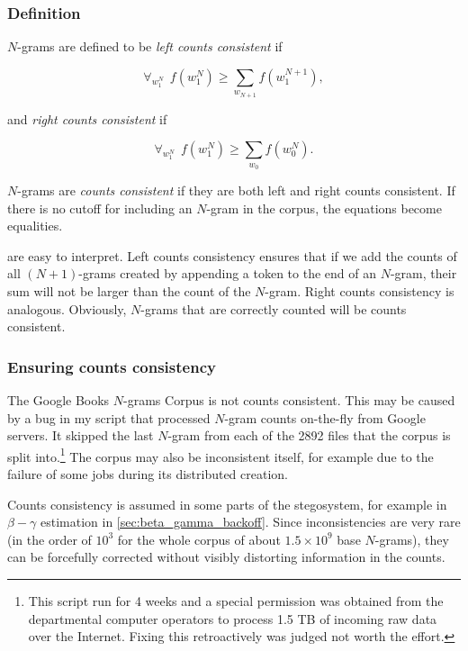 \documentclass[draft]{IIBproject}
\makeatletter
\DeclareRobustCommand{\npgrams}{\mbox{$(N{+}1)$-grams}\@\xspace}
\makeatother
\begin{document}
\subsubsection{Definition}

$N$-grams are defined to be \emph{left counts consistent} if

\begin{equation}
\label{eq:left_counts_consistency}
\forall_{w_1^N} ~~ f(w_1^N) \ge \sum_{w_{N+1}} f(w_1^{N+1}),
\end{equation}

and \emph{right counts consistent} if

\begin{equation}
\label{eq:right_counts_consistency}
\forall_{w_1^N} ~~ f(w_1^N) \ge \sum_{w_0} f(w_0^N).
\end{equation}

$N$-grams are \emph{counts consistent} if they are both left and right counts consistent. If there is no cutoff for including an $N$-gram in the corpus, the equations become equalities.

 are easy to interpret. Left counts consistency ensures that if we add the counts of all \npgrams created by appending a token to the end of an $N$-gram, their sum will not be larger than the count of the $N$-gram. Right counts consistency is analogous. Obviously, $N$-grams that are correctly counted will be counts consistent.

\subsubsection{Ensuring counts consistency}

The Google Books $N$-grams Corpus is not counts consistent. This may be caused by a bug in my script that processed $N$-gram counts on-the-fly from Google servers. It skipped the last $N$-gram from each of the 2892 files that the corpus is split into.\footnote{This script run for 4 weeks and a special permission was obtained from the departmental computer operators to process 1.5 TB of incoming raw data over the Internet. Fixing this retroactively was judged not worth the effort.} The corpus may also be inconsistent itself, for example due to the failure of some jobs during its distributed creation.

Counts consistency is assumed in some parts of the stegosystem, for example in $\beta{-}\gamma$ estimation in \cref{sec:beta_gamma_backoff}. Since inconsistencies are very rare (in the order of $10^3$ for the whole corpus of about $1.5 \times 10^9$ base $N$-grams), they can be forcefully corrected without visibly distorting information in the counts.
\end{document}
